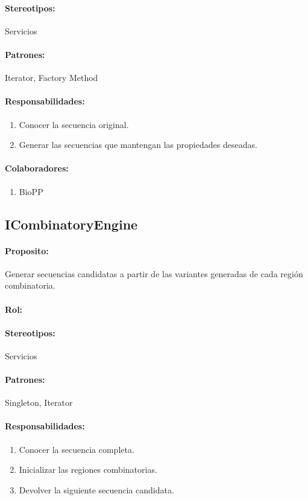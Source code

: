 \documentclass[a4paper,10pt]{article}
\begin{document}
    \paragraph{Stereotipos:} Servicios
    \paragraph{Patrones:} Iterator, Factory Method
    \paragraph{Responsabilidades:}
      \begin{enumerate}
       \item Conocer la secuencia original.
       \item Generar las secuencias que mantengan las propiedades deseadas.
      \end{enumerate}
    \paragraph{Colaboradores:}
      \begin{enumerate}
       \item BioPP
      \end{enumerate}

  \subsection{ICombinatoryEngine}
    \paragraph{Proposito:} Generar secuencias candidatas a partir de las
variantes generadas de cada regi\'on combinatoria.
    \paragraph{Rol:}
    \paragraph{Stereotipos:} Servicios
    \paragraph{Patrones:} Singleton, Iterator
    \paragraph{Responsabilidades:}
      \begin{enumerate}
       \item Conocer la secuencia completa.
       \item Inicializar las regiones combinatorias.
       \item Devolver la siguiente secuencia candidata.
      \end{enumerate}
\end{document}
